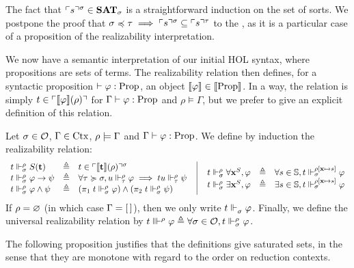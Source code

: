 \documentclass[a4paper,UKenglish,cleveref, autoref, thm-restate]{lipics-v2021}
\begin{document}
The fact that $\ulcorner s\urcorner^{\sigma} \in{\mathbf{SAT}}_{\sigma}$ is a straightforward induction on the set of sorts. We postpone the proof that $\sigma\preccurlyeq \tau \implies \ulcorner s\urcorner^{\sigma} \subseteq \ulcorner s\urcorner^{\tau}$ to the  , as it is a particular case of a proposition of the realizability interpretation.

We now have a semantic interpretation of our initial HOL syntax, where propositions are sets of terms. The realizability relation then defines, for a syntactic proposition $\vdash \varphi : \mathrm{Prop}$, an object $\llbracket \varphi \rrbracket \in \llbracket \mathrm{Prop} \rrbracket$. In a way, the relation is simply $t \in \ulcorner\llbracket \varphi \rrbracket(\rho)\urcorner$ for $\Gamma\vdash \varphi : \mathrm{Prop}$ and $\rho\models \Gamma$, but we prefer to give an explicit definition of this relation.

\begin{definition}\label{def:real}

Let $\sigma \in \mathcal O$, $\Gamma \in \mathrm{Ctx}$, $\rho \models \Gamma$ and $\Gamma\vdash \varphi : \mathrm{Prop}$. We define by induction the realizability relation:
\[\begin{array}{lcl}
   t \realPP \sortPred{\termt} &\defeq& t \in \codE{\sem{\termt}(\termenv)}
      \\
      t \realPP \varphi \to \psi &\defeq& \forall \enviroT \supOr\enviro, u \realP{\enviroT}{\termenv} \varphi \implies tu \realP{\enviroT}{\termenv}\psi
      \\
      t \realPP \varphi \land \psi &\defeq& (\pi_1\;t \realPP \varphi) \land (\pi_2\;t \realPP \psi)
     \end{array}
     ~~
     \vrule~~
     \begin{array}{lcl}
      t \realPP \forall \varx^S, \varphi &\defeq& \forall s \in \bS, t\realP{\enviro}{\termenv[\varx \mapsto s]} \varphi
      \\
      t \realPP \exists \varx^S, \varphi& \defeq& \exists s \in \bS, t \realP{\enviro}{\termenv[\varx \mapsto s]} \varphi
     \end{array}
  \]
If $\rho = \varnothing$ (in which case $\Gamma = [\,]$), then we only write $t \Vdash_{\sigma}^{} \varphi$.
Finally, we define the universal realizability relation by
  $t \Vvdash^{\rho} \varphi \triangleq \forall \sigma \in \mathcal O, t \Vdash_{\sigma}^{\rho}\varphi$.
\end{definition}

The following proposition justifies that the definitions give saturated sets, in the sense that they are monotone with regard to the order on reduction contexts.
\end{document}
